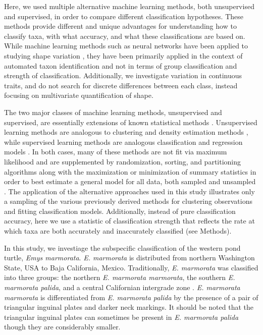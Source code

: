 \documentclass[12pt,letterpaper]{article}\usepackage{graphicx, color}
\begin{document}
Here, we used multiple alternative machine learning methods, both unsupervised and supervised, in order to compare different classification hypotheses. These methods provide different and unique advantages for understanding how to classify taxa, with what accuracy, and what these classifications are based on. While machine learning methods such as neural networks have been applied to studying shape variation \citep{MacLeod2007}, they have been primarily applied in the context of automated taxon identification and not in terms of group classification and strength of classification. Additionally, we investigate variation in continuous traits, and do not search for discrete differences between each class, instead focusing on multivariate quantification of shape.

The two major classes of machine learning methods, unsupervised and supervised, are essentially extensions of known statistical methods \citep{Hastie2009}. Unsupervised learning methods are analogous to clustering and density estimation methods \citep{Kaufman1990}, while supervised learning methods are analogous classification and regression models \citep{Breiman1984}. In both cases, many of these methods are not fit via maximum likelihood and are supplemented by randomization, sorting, and partitioning algorithms along with the maximization or minimization of summary statistics in order to best estimate a general model for all data, both sampled and unsampled \citep{Hastie2009}. The application of the alternative approaches used in this study illustrates only a sampling of the various previously derived methods for clustering observations and fitting classification models. 
Additionally, instead of pure classification accuracy, here we use a statistic of classification strength that reflects the rate at which taxa are both accurately and inaccurately classified (see Methods).


In this study, we investiage the subspecific classification of the western pond turtle, \textit{Emys marmorata}. \textit{E. marmorata} is distributed from northern Washington State, USA to Baja California, Mexico.
Traditionally, \textit{E. marmorata} was classified into three groups: the northern \textit{E. marmorata marmorata}, the southern \textit{E. marmorata palida}, and a central Californian intergrade zone \citep{Seeliger1945}. \textit{E. marmorata marmorata} is differentiated from \textit{E. marmorata palida} by the presence of a pair of triangular inguinal plates and darker neck markings. It should be noted that the triangular inguinal plates can sometimes be present in \textit{E. marmorata palida} though they are considerably smaller.
\end{document}
